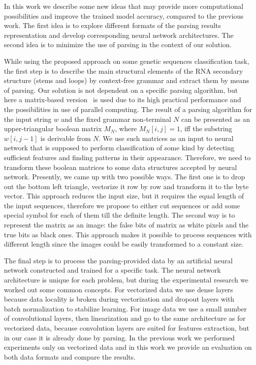 \documentclass[12pt,a4paper]{cibb}
\begin{document}
In this work we describe some new ideas that may provide more computational possibilities and improve the trained model accuracy, compared to the previous work.
The first idea is to explore different formats of the parsing results representation and develop corresponding neural network architectures. The second idea is to minimize the use of parsing in the context of our solution.

While using the proposed approach on some genetic sequences classification task, the first step is to describe the main structural elements of the RNA secondary structure (stems and loops) by context-free grammar and extract them by means of parsing.
Our solution is not dependent on a specific parsing algorithm, but here a matrix-based version~\cite{Azimov:2018:CPQ:3210259.3210264} is used due to its high practical performance and the possibilities in use of parallel computing.
The result of a parsing algorithm for the input string $w$ and the fixed grammar non-terminal $N$ can be presented as an upper-triangular boolean matrix $M_N$, where $M_N [i,j] = 1$, iff the substring $w[i,j-1]$ is derivable from $N$.
We use such matrices as an input to neural network that is supposed to perform classification of some kind by detecting sufficient features and finding patterns in their appearance.
Therefore, we need to transform these boolean matrices to some data structures accepted by neural network.
Presently, we came up with two possible ways.
The first one is to drop out the bottom left triangle, vectorize it row by row and transform it to the byte vector.
This approach reduces the input size, but it requires the equal length of the input sequences, therefore we propose to either cut sequences or add some special symbol for each of them till the definite length.
The second way is to represent the matrix as an image: the false bits of matrix as white pixels and the true bits as black ones.
This approach makes it possible to process sequences with different length since the images could be easily transformed to a constant size. 

The final step is to process the parsing-provided data by an artificial neural network constructed and trained for a specific task.
The neural network architecture is unique for each problem, but during the experimental research we worked out some common concepts.
For vectorized data we use dense layers because data locality is broken during vectorization and dropout layers with batch normalization to stabilize learning.
For image data we use a small number of convolutional layers, then linearization and go to the same architecture as for vectorized data, because convolution layers are suited for features extraction, but in our case it is already done by parsing.
In the previous work we performed experiments only on vectorized data and in this work we provide an evaluation on both data formats and compare the results.
\end{document}
